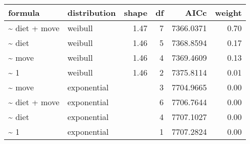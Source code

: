 \begin{table}[ht]
\centering
\begin{tabular}{llrrrr}
 formula & distribution & shape & df & AICc & weight \\ 
  \hline
\~{} diet + move & weibull & 1.47 & 7 & 7366.0371 & 0.70 \\ 
  \~{} diet & weibull & 1.46 & 5 & 7368.8594 & 0.17 \\ 
  \~{} move & weibull & 1.46 & 4 & 7369.4609 & 0.13 \\ 
  \~{} 1 & weibull & 1.46 & 2 & 7375.8114 & 0.01 \\ 
  \~{} move & exponential &  & 3 & 7704.9665 & 0.00 \\ 
  \~{} diet + move & exponential &  & 6 & 7706.7644 & 0.00 \\ 
  \~{} diet & exponential &  & 4 & 7707.1027 & 0.00 \\ 
  \~{} 1 & exponential &  & 1 & 7707.2824 & 0.00 \\ 
  \end{tabular}
\label{tab:er}
\end{table}
